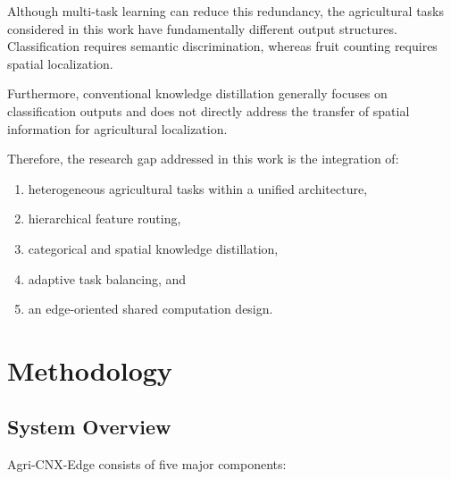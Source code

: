 \documentclass[preprint,12pt]{elsarticle}
\begin{document}
Although multi-task learning can reduce this redundancy, the agricultural
tasks considered in this work have fundamentally different output
structures. Classification requires semantic discrimination, whereas
fruit counting requires spatial localization.

Furthermore, conventional knowledge distillation generally focuses on
classification outputs and does not directly address the transfer of
spatial information for agricultural localization.

Therefore, the research gap addressed in this work is the integration of:

\begin{enumerate}

\item heterogeneous agricultural tasks within a unified architecture,

\item hierarchical feature routing,

\item categorical and spatial knowledge distillation,

\item adaptive task balancing, and

\item an edge-oriented shared computation design.

\end{enumerate}


\section{Methodology}
\label{sec:methodology}


\subsection{System Overview}

Agri-CNX-Edge consists of five major components:
\end{document}
